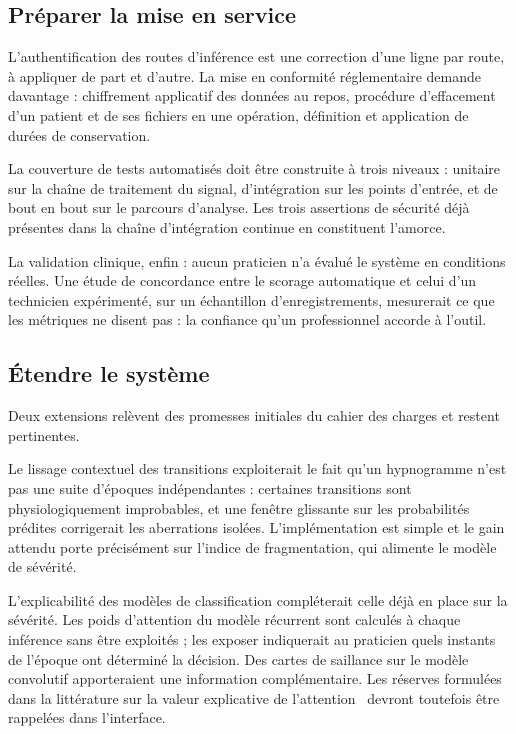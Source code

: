 \subsection*{Préparer la mise en service}

L'authentification des routes d'inférence est une correction d'une ligne par
route, à appliquer de part et d'autre. La mise en conformité réglementaire
demande davantage : chiffrement applicatif des données au repos, procédure d'effacement
d'un patient et de ses fichiers en une opération, définition et application de durées de
conservation.

La couverture de tests automatisés doit être construite à trois niveaux :
unitaire sur la chaîne de traitement du signal, d'intégration sur les points d'entrée,
et de bout en bout sur le parcours d'analyse. Les trois assertions de sécurité déjà
présentes dans la chaîne d'intégration continue en constituent l'amorce.

La validation clinique, enfin : aucun praticien n'a évalué le système en
conditions réelles. Une étude de concordance entre le scorage automatique et celui d'un
technicien expérimenté, sur un échantillon d'enregistrements, mesurerait ce que les
métriques ne disent pas : la confiance qu'un professionnel accorde à l'outil.

\subsection*{Étendre le système}

Deux extensions relèvent des promesses initiales du cahier des charges et restent
pertinentes.

Le lissage contextuel des transitions exploiterait le fait qu'un hypnogramme
n'est pas une suite d'époques indépendantes : certaines transitions sont
physiologiquement improbables, et une fenêtre glissante sur les probabilités
prédites corrigerait les aberrations isolées. L'implémentation est simple et le gain
attendu porte précisément sur l'indice de fragmentation, qui alimente le modèle de
sévérité.

L'explicabilité des modèles de classification compléterait celle déjà en place
sur la sévérité. Les poids d'attention du modèle récurrent sont calculés à chaque
inférence sans être exploités ; les exposer indiquerait au praticien quels instants de
l'époque ont déterminé la décision. Des cartes de saillance sur le modèle convolutif
apporteraient une information complémentaire. Les réserves formulées dans la
littérature sur la valeur explicative de l'attention~\cite{jain2019,wiegreffe2019} devront
toutefois être rappelées dans l'interface.

